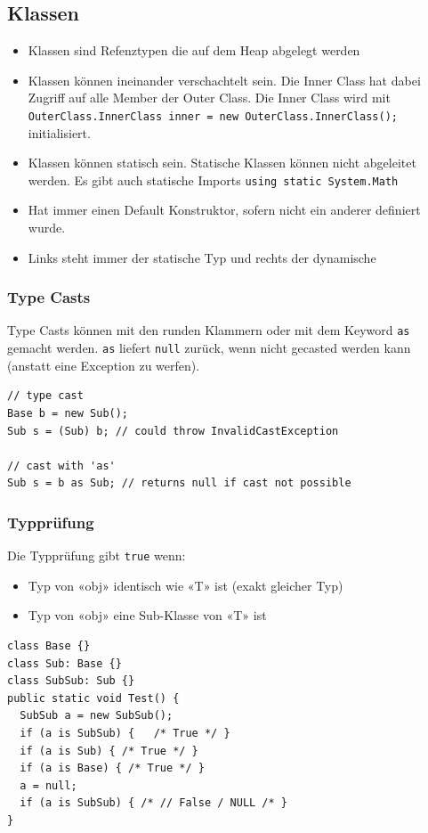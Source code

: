 \documentclass[
a4paper,
oneside,
10pt,
fleqn,
headsepline,
toc=listofnumbered, 
bibliography=totocnumbered]{scrartcl}
\begin{document}
\subsection{Klassen}
\begin{itemize}
	\item Klassen sind Refenztypen die auf dem Heap abgelegt werden
	\item Klassen können ineinander verschachtelt sein. Die Inner Class hat dabei Zugriff auf alle Member der Outer Class. Die Inner Class wird mit \lstinline|OuterClass.InnerClass inner = new OuterClass.InnerClass();| initialisiert.
	\item Klassen können statisch sein. Statische Klassen können nicht abgeleitet werden. Es gibt auch statische Imports \lstinline|using static System.Math|
	\item Hat immer einen Default Konstruktor, sofern nicht ein anderer definiert wurde.
	\item Links steht immer der statische Typ und rechts der dynamische
\end{itemize}

\subsubsection{Type Casts}
Type Casts können mit den runden Klammern oder mit dem Keyword \lstinline|as| gemacht werden. \lstinline|as| liefert \lstinline|null| zurück, wenn nicht gecasted werden kann (anstatt eine Exception zu werfen). 
\begin{lstlisting}
// type cast
Base b = new Sub();
Sub s = (Sub) b; // could throw InvalidCastException

// cast with 'as'
Sub s = b as Sub; // returns null if cast not possible

\end{lstlisting}

\subsubsection{Typprüfung}
Die Typprüfung gibt \lstinline|true| wenn:
\begin{itemize}
    \item Typ von «obj» identisch wie «T» ist (exakt gleicher Typ)
    \item Typ von «obj» eine Sub-Klasse von «T» ist 
\end{itemize}
\begin{lstlisting}
class Base {}
class Sub: Base {}
class SubSub: Sub {}
public static void Test() {
  SubSub a = new SubSub();
  if (a is SubSub) {   /* True */ }
  if (a is Sub) { /* True */ } 
  if (a is Base) { /* True */ }
  a = null; 
  if (a is SubSub) { /* // False / NULL /* } 
} 
\end{lstlisting}
\end{document}
